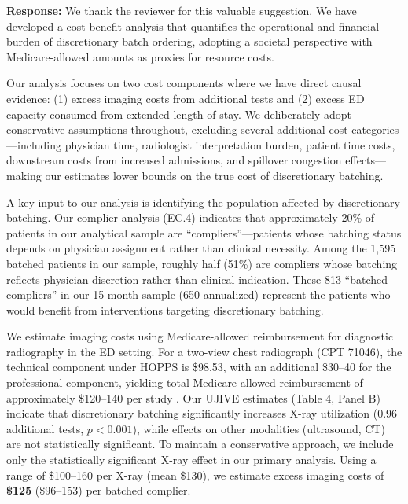\documentclass[11pt]{article}
\newcommand{\1}{\hbox{\rm 1\kern-.35em 1}}
\begin{document}
\noindent\textbf{Response:}\color{blue} We thank the reviewer for this valuable suggestion. We have developed a cost-benefit analysis that quantifies the operational and financial burden of discretionary batch ordering, adopting a societal perspective with Medicare-allowed amounts as proxies for resource costs.

Our analysis focuses on two cost components where we have direct causal evidence: (1) excess imaging costs from additional tests and (2) excess ED capacity consumed from extended length of stay. We deliberately adopt conservative assumptions throughout, excluding several additional cost categories---including physician time, radiologist interpretation burden, patient time costs, downstream costs from increased admissions, and spillover congestion effects---making our estimates lower bounds on the true cost of discretionary batching.

A key input to our analysis is identifying the population affected by discretionary batching. Our complier analysis (EC.4) indicates that approximately 20\% of patients in our analytical sample are ``compliers''---patients whose batching status depends on physician assignment rather than clinical necessity. Among the 1,595 batched patients in our sample, roughly half (51\%) are compliers whose batching reflects physician discretion rather than clinical indication. These 813 ``batched compliers'' in our 15-month sample (650 annualized) represent the patients who would benefit from interventions targeting discretionary batching.

We estimate imaging costs using Medicare-allowed reimbursement for diagnostic radiography in the ED setting. For a two-view chest radiograph (CPT 71046), the technical component under HOPPS is \$98.53, with an additional \$30--40 for the professional component, yielding total Medicare-allowed reimbursement of approximately \$120--140 per study \citep{dabus2025practice}. Our UJIVE estimates (Table 4, Panel B) indicate that discretionary batching significantly increases X-ray utilization (0.96 additional tests, $p < 0.001$), while effects on other modalities (ultrasound, CT) are not statistically significant. To maintain a conservative approach, we include only the statistically significant X-ray effect in our primary analysis. Using a range of \$100--160 per X-ray (mean \$130), we estimate excess imaging costs of \textbf{\$125} (\$96--153) per batched complier.
\end{document}
